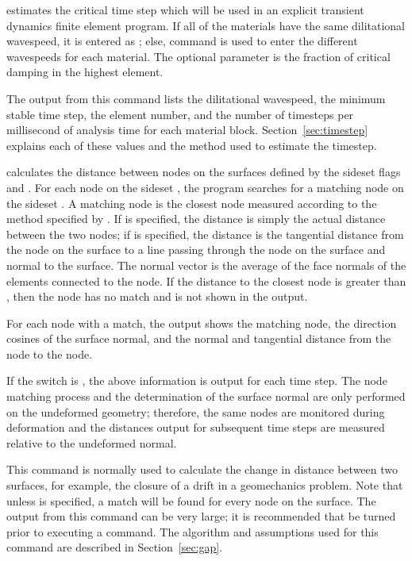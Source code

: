  {
 estimates the critical time step which will be used in an
explicit transient dynamics finite element program. If all of the
materials have the same dilitational wavespeed, it is entered as
; else, command  is used to enter the
different wavespeeds for each material.  The optional parameter
 is the fraction of critical damping in the
highest element.

The output from this command lists the dilitational wavespeed, the
minimum stable time step, the element number, and the number of
timesteps per millisecond of analysis time for each material block.
Section~\ref{sec:timestep} explains each of these values and the method
used to estimate the timestep.
}

 {
 calculates the distance between nodes on the surfaces defined
by the sideset flags  and .  For each
node on the sideset , the program searches for a
matching node on the sideset .  A matching node is the
closest node measured according to the method specified by
.  If  is specified, the
distance is simply the actual distance between the two nodes; if
 is specified, the distance is the tangential distance from
the node on the  surface to a line passing through the
node on the  surface and normal to the surface.  The
normal vector is the average of the face normals of the elements
connected to the node.  If the distance to the closest 
node is greater than , then the  node
has no match and is not shown in the output.

For each   node with a match, the output shows the
matching   node, the direction cosines of the surface
normal, and the normal and tangential distance from the
 node to the   node.

If the  switch is , the above information is output
for each time step.  The node matching process and the determination of
the surface normal are only performed on the undeformed geometry;
therefore, the same nodes are monitored during deformation and the
distances output for subsequent time steps are measured relative to the
undeformed normal.

This command is normally used to calculate the change in distance
between two surfaces, for example, the closure of a drift in a
geomechanics problem.  Note that unless  is specified,
a match will be found for every node on the  surface.
The output from this command can be very large; it is recommended that
 be turned  prior to executing a  command.
The algorithm and assumptions used for this command are described in
Section~\ref{sec:gap}.
}

